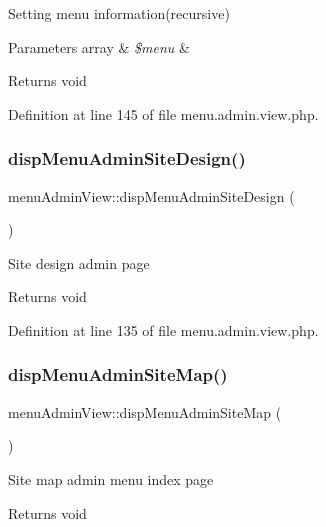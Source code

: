 Setting menu information(recursive) 
\begin{DoxyParams}[1]{Parameters}
array & {\em \$menu} & \\
\hline
\end{DoxyParams}
\begin{DoxyReturn}{Returns}
void 
\end{DoxyReturn}


Definition at line 145 of file menu.\+admin.\+view.\+php.

\mbox{\label{classmenuAdminView_a29d653c99c2e86ed5b8324042ef447ba}} 
\subsubsection{\texorpdfstring{disp\+Menu\+Admin\+Site\+Design()}{dispMenuAdminSiteDesign()}}
{\footnotesize\ttfamily menu\+Admin\+View\+::disp\+Menu\+Admin\+Site\+Design (\begin{DoxyParamCaption}{ }\end{DoxyParamCaption})}

Site design admin page \begin{DoxyReturn}{Returns}
void 
\end{DoxyReturn}


Definition at line 135 of file menu.\+admin.\+view.\+php.

\mbox{\label{classmenuAdminView_afa55cc43041d721b52b8504c3b34e625}} 
\subsubsection{\texorpdfstring{disp\+Menu\+Admin\+Site\+Map()}{dispMenuAdminSiteMap()}}
{\footnotesize\ttfamily menu\+Admin\+View\+::disp\+Menu\+Admin\+Site\+Map (\begin{DoxyParamCaption}{ }\end{DoxyParamCaption})}

Site map admin menu index page \begin{DoxyReturn}{Returns}
void 
\end{DoxyReturn}


